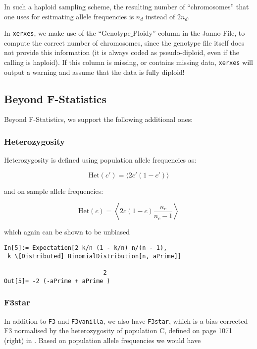 \documentclass{article}
\begin{document}
In such a haploid sampling scheme, the resulting number of {``}chromosomes{''} that one uses for esitmating allele frequencies is \(n_d\) instead of \(2n_d\). 

In \texttt{xerxes}, we make use of the {``}Genotype$\_$Ploidy{''} column in the Janno File, to compute the correct number of chromosomes, since the genotype file itself does not provide this information (it is always coded as pseudo-diploid, even if the calling is haploid). If this column is missing, or contains missing data, \texttt{xerxes} will output a warning and assume that the data is fully diploid!

\subsection{Beyond F-Statistics}

Beyond F-Statistics, we support the following additional ones:

\subsubsection{Heterozygosity}

Heterozygosity is defined using population allele frequencies as:

\begin{equation}
\text{Het}(c')=\langle 2c'(1-c')\rangle
\end{equation}

and on sample allele frequencies:

\begin{equation}
\text{Het}(c)=\left\langle 2 c(1-c )\frac{n_c}{n_c-1}\right\rangle
\end{equation}

which again can be shown to be unbiased

\begin{lstlisting}
In[5]:= Expectation[2 k/n (1 - k/n) n/(n - 1),                                  
 k \[Distributed] BinomialDistribution[n, aPrime]]                              

                            2
Out[5]= -2 (-aPrime + aPrime )
\end{lstlisting}

\subsubsection{F3star}

In addition to \texttt{F3} and \texttt{F3vanilla}, we also have \texttt{F3star}, which is a bias-corrected F3 normalised by the heterozygosity of population C, defined on page 1071 (right) in \cite{Patterson2012-yq}. Based on population allele frequencies we would have
\end{document}
